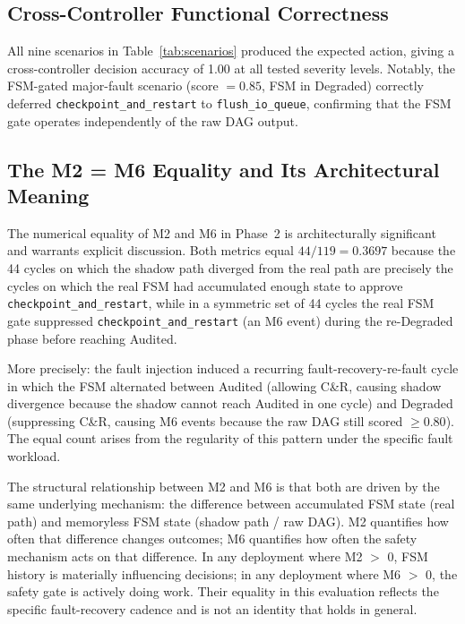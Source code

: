 \documentclass[runningheads]{llncs}
\begin{document}
\subsection{Cross-Controller Functional Correctness}

All nine scenarios in Table~\ref{tab:scenarios} produced the expected
action, giving a cross-controller decision accuracy of 1.00 at all
tested severity levels. Notably, the FSM-gated major-fault scenario
(score $= 0.85$, FSM in Degraded) correctly deferred
\texttt{checkpoint\_and\_restart} to \texttt{flush\_io\_queue},
confirming that the FSM gate operates independently of the raw DAG
output.

\subsection{The M2 = M6 Equality and Its Architectural Meaning}

The numerical equality of M2 and M6 in Phase~2 is architecturally
significant and warrants explicit discussion. Both metrics equal
$44/119 = 0.3697$ because the 44 cycles on which the shadow path
diverged from the real path are precisely the cycles on which the real
FSM had accumulated enough state to approve \texttt{checkpoint\_and\_restart},
while in a symmetric set of 44 cycles the real FSM gate suppressed
\texttt{checkpoint\_and\_restart} (an M6 event) during the
re-Degraded phase before reaching Audited.

More precisely: the fault injection induced a recurring
fault-recovery-re-fault cycle in which the FSM alternated between
Audited (allowing C\&R, causing shadow divergence because the shadow
cannot reach Audited in one cycle) and Degraded (suppressing C\&R,
causing M6 events because the raw DAG still scored $\geq 0.80$). The
equal count arises from the regularity of this pattern under the
specific fault workload.

The structural relationship between M2 and M6 is that both are driven
by the same underlying mechanism: the difference between accumulated
FSM state (real path) and memoryless FSM state (shadow path / raw DAG).
M2 quantifies how often that difference changes outcomes; M6 quantifies
how often the safety mechanism acts on that difference. In any
deployment where M2 $>$ 0, FSM history is materially influencing
decisions; in any deployment where M6 $>$ 0, the safety gate is
actively doing work. Their equality in this evaluation reflects the
specific fault-recovery cadence and is not an identity that holds in
general.
\end{document}
